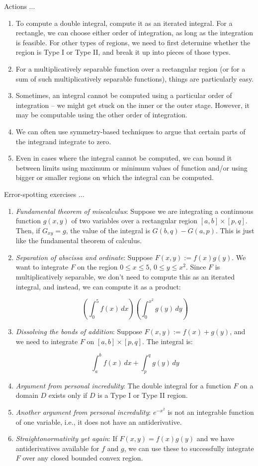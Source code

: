 \documentclass[10pt]{amsart}
\begin{document}
Actions ...

\begin{enumerate}
\item To compute a double integral, compute it as an iterated
  integral. For a rectangle, we can choose either order of
  integration, as long as the integration is feasible. For other types
  of regions, we need to first determine whether the region is Type I
  or Type II, and break it up into pieces of those types.
\item For a multiplicatively separable function over a rectangular
  region (or for a sum of such multiplicatively separable functions),
  things are particularly easy.
\item Sometimes, an integral cannot be computed using a particular
  order of integration -- we might get stuck on the inner or the outer
  stage. However, it may be computable using the other order of
  integration.
\item We can often use symmetry-based techniques to argue that certain
  parts of the integrand integrate to zero.
\item Even in cases where the integral cannot be computed, we can
  bound it between limits using maximum or minimum values of function
  and/or using bigger or smaller regions on which the integral can be
  computed.
\end{enumerate}

Error-spotting exercises ...

\begin{enumerate}
\item {\em Fundamental theorem of miscalculus}: Suppose we are
  integrating a continuous function $g(x,y)$ of two variables over a
  rectangular region $[a,b] \times [p,q]$. Then, if $G_{xy} = g$, the
  value of the integral is $G(b,q) - G(a,p)$. This is just like the
  fundamental theorem of calculus.
\item {\em Separation of abscissa and ordinate}: Suppose $F(x,y) :=
  f(x)g(y)$. We want to integrate $F$ on the region $0 \le x \le 5$,
  $0 \le y \le x^2$. Since $F$ is multiplicatively separable, we don't
  need to compute this as an iterated integral, and instead, we can
  compute it as a product:

  $$\left(\int_0^5 f(x) \, dx\right)\left(\int_0^{x^2} g(y) \, dy \right)$$
\item {\em Dissolving the bonds of addition}: Suppose $F(x,y) := f(x)
  + g(y)$, and we need to integrate $F$ on $[a,b] \times [p,q]$. The
  integral is:

  $$\int_a^b f(x) \, dx + \int_p^q g(y) \, dy$$
\item {\em Argument from personal incredulity}: The double integral for
  a function $F$ on a domain $D$ exists only if $D$ is a Type I or
  Type II region.
\item {\em Another argument from personal incredulity}: $e^{-x^2}$ is
  not an integrable function of one variable, i.e., it does not have
  an antiderivative.
\item {\em Straightonormativity yet again}: If $F(x,y) = f(x)g(y)$ and
  we have antiderivatives available for $f$ and $g$, we can use these
  to successfully integrate $F$ over any closed bounded convex region.
\end{enumerate}
\end{document}
